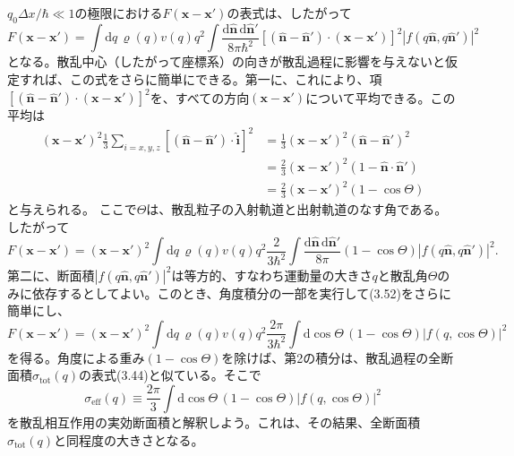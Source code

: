 $q_0\Delta x/\hbar\ll1$の極限における$F(\bm x-\bm x')$の表式は、したがって
\begin{equation}
F(\bm x-\bm x')=\int\mathrm dq\,\varrho(q)v(q)q^2\int\frac{\mathrm d\hat{\bm n}\,\mathrm d\hat{\bm n}'}{8\pi\hbar^2}
[(\hat{\bm n}-\hat{\bm n}')\cdot(\bm x-\bm x')]^2|f(q\hat{\bm n},q\hat{\bm n}')|^2
\tag{3.50}
\end{equation}
となる。散乱中心（したがって座標系）の向きが散乱過程に影響を与えないと仮定すれば、この式をさらに簡単にできる。第一に、これにより、項$[(\hat{\bm n}-\hat{\bm n}')\cdot(\bm x-\bm x')]^2$を、すべての方向$(\bm x-\bm x')$について平均できる。この平均は
\begin{equation}
\begin{aligned}
(\bm x-\bm x')^2\frac13\sum_{i=x,y,z}[(\hat{\bm n}-\hat{\bm n}')\cdot\hat{\bm i}]^2
&=\frac13(\bm x-\bm x')^2(\hat{\bm n}-\hat{\bm n}')^2\\
&=\frac23(\bm x-\bm x')^2(1-\hat{\bm n}\cdot\hat{\bm n}')\\
&=\frac23(\bm x-\bm x')^2(1-\cos\Theta)
\end{aligned}\tag{3.51}
\end{equation}
と与えられる。
\hypertarget{srcpage:131}{}\label{srcpage:131}
ここで$\Theta$は、散乱粒子の入射軌道と出射軌道のなす角である。したがって
\begin{equation}
F(\bm x-\bm x')=(\bm x-\bm x')^2\int\mathrm dq\,\varrho(q)v(q)q^2\frac{2}{3\hbar^2}
\int\frac{\mathrm d\hat{\bm n}\,\mathrm d\hat{\bm n}'}{8\pi}(1-\cos\Theta)|f(q\hat{\bm n},q\hat{\bm n}')|^2.
\tag{3.52}
\end{equation}
第二に、断面積$|f(q\hat{\bm n},q\hat{\bm n}')|^2$は等方的、すなわち運動量の大きさ$q$と散乱角$\Theta$のみに依存するとしてよい。このとき、角度積分の一部を実行して(3.52)をさらに簡単にし、
\begin{equation}
F(\bm x-\bm x')=(\bm x-\bm x')^2\int\mathrm dq\,\varrho(q)v(q)q^2\frac{2\pi}{3\hbar^2}
\int\mathrm d\cos\Theta\,(1-\cos\Theta)|f(q,\cos\Theta)|^2
\tag{3.53}
\end{equation}
を得る。角度による重み$(1-\cos\Theta)$を除けば、第2の積分は、散乱過程の全断面積$\sigma_{\mathrm{tot}}(q)$の表式(3.44)と似ている。そこで
\begin{equation}
\sigma_{\mathrm{eff}}(q)\equiv\frac{2\pi}{3}\int\mathrm d\cos\Theta\,(1-\cos\Theta)|f(q,\cos\Theta)|^2
\tag{3.54}
\end{equation}
を散乱相互作用の実効断面積と解釈しよう。これは、その結果、全断面積$\sigma_{\mathrm{tot}}(q)$と同程度の大きさとなる。


